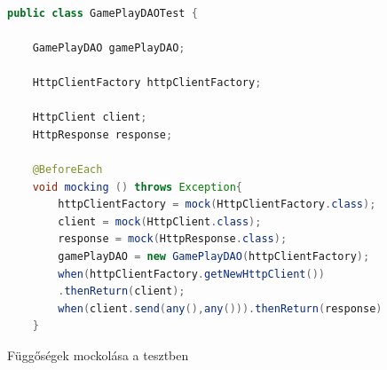 \documentclass[a4paper,twoside]{article}
\begin{document}
\begin{figure}
	\caption{Függőségek mockolása a tesztben}
	\raggedleft
	\begin{lstlisting}[language=java,breaklines=true]
		
public class GamePlayDAOTest {
		
	GamePlayDAO gamePlayDAO;
		
	HttpClientFactory httpClientFactory;
		
	HttpClient client;
	HttpResponse response;
	
	@BeforeEach
	void mocking () throws Exception{
		httpClientFactory = mock(HttpClientFactory.class);
		client = mock(HttpClient.class);
		response = mock(HttpResponse.class);
		gamePlayDAO = new GamePlayDAO(httpClientFactory);
		when(httpClientFactory.getNewHttpClient())
		.thenReturn(client);
		when(client.send(any(),any())).thenReturn(response);
	}
	\end{lstlisting}
	\label{mocking}
\end{figure} 
\end{document}
